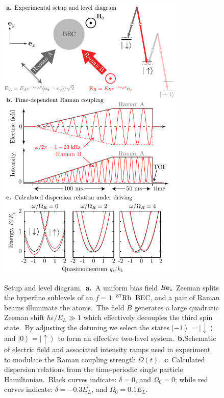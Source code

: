 \documentclass[twocolumn,amsmath,amssymb,floatfix,prl]{revtex4-1}
\def\Rb87{^{87}\rm{Rb}}					%
\newcommand{\ket}[1]{\left|#1\right>}
\begin{document}
\begin{figure}
 \begin{center}
 \includegraphics[width=3.5in]{epsfiles/Figure1.pdf}\\
 \end{center}
 \vspace{-0pt}
 \caption[Setup and level diagram.]{Setup and level diagram.~{\bf a.}~A uniform bias field $B {\bf e}_z$ Zeeman splits the hyperfine sublevels of an $f=1$~$\Rb87$~BEC, and a pair of Raman beams illuminate the atoms.~The field $B$ generates a large quadratic Zeeman shift $\hbar \epsilon/E_L \gg 1$ which effectively decouples the third spin state.~By adjusting the detuning we select the states $\ket{-1}=\ket{\downarrow}$ and $\ket{0}=\ket{\uparrow}$ to form an effective two-level system.~{\bf b.}\;Schematic of electric field and associated intensity ramps used in experiment~\cite{Juzeliunas2012} to modulate the Raman coupling strength $\Omega(t)$.~{\bf c}~Calculated dispersion relations from the time-periodic single particle Hamiltonian.~Black curves indicate: $\delta = 0$, and $\Omega_0 = 0$; while red curves indicate: ${\delta = -0.3 E_L}$, and $\Omega_0 = 0.1 E_L$.}
 \label{fig:SOC_ExpSetup}
\end{figure}
\end{document}
